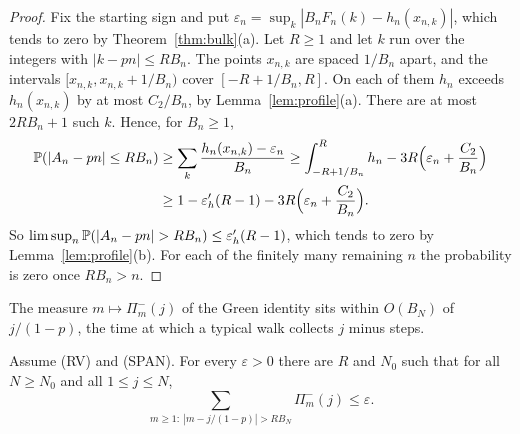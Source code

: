 \begin{proof}
Fix the starting sign and put $\varepsilon_n=\sup_k|B_nF_n(k)-h_n(x_{n,k})|$, which
tends to zero by Theorem~\ref{thm:bulk}(a). Let $R\ge1$ and let $k$ run over the
integers with $|k-pn|\le RB_n$. The points $x_{n,k}$ are spaced $1/B_n$ apart, and the
intervals $[x_{n,k},x_{n,k}+1/B_n)$ cover $[-R+1/B_n,R]$. On each of them $h_n$
exceeds $h_n(x_{n,k})$ by at most $C_2/B_n$, by Lemma~\ref{lem:profile}(a). There are
at most $2RB_n+1$ such $k$. Hence, for $B_n\ge1$,
\begin{align*}
 \mathbb{P}(|A_n-pn|\le RB_n)&\ge\sum_k\frac{h_n(x_{n,k})-\varepsilon_n}{B_n}
 \ge\int_{-R+1/B_n}^{R}h_n-3R\Bigl(\varepsilon_n+\frac{C_2}{B_n}\Bigr)\\
 &\ge1-\varepsilon'_h(R-1)-3R\Bigl(\varepsilon_n+\frac{C_2}{B_n}\Bigr).
\end{align*}
So $\limsup_n\Prob(|A_n-pn|>RB_n)\le\varepsilon'_h(R-1)$, which tends to zero by
Lemma~\ref{lem:profile}(b). For each of the finitely many remaining $n$ the
probability is zero once $RB_n>n$.
\end{proof}

The measure $m\mapsto\Pi^\minus_m(j)$ of the Green identity sits within $O(B_N)$ of
$j/(1-p)$, the time at which a typical walk collects $j$ minus steps.

\begin{lemma}\label{lem:green-conc}
Assume (RV) and (SPAN). For every $\varepsilon>0$ there are $R$ and $N_0$ such that
for all $N\ge N_0$ and all $1\le j\le N$,
\[
 \sum_{m\ge1:\ |m-j/(1-p)|>RB_N}\Pi^\minus_m(j)\le\varepsilon .
\]
\end{lemma}

